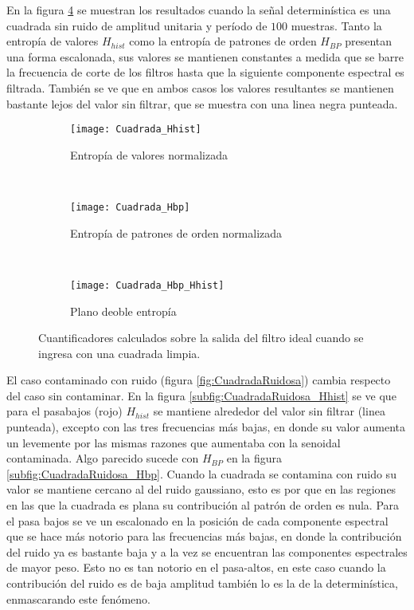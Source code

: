 En la figura \ref{fig:Cuadrada} se muestran los resultados cuando la señal determinística es una cuadrada sin ruido de amplitud unitaria y período de $100$ muestras. Tanto la entropía de valores $H_{hist}$ como la entropía de patrones de orden $H_{BP}$ presentan una forma escalonada, sus valores se mantienen constantes a medida que se barre la frecuencia de corte de los filtros hasta que la siguiente componente espectral es filtrada. También se ve que en ambos casos los valores resultantes se mantienen bastante lejos del valor sin filtrar, que se muestra con una linea negra punteada.

\begin{figure}[h]
    \centering
    \begin{subfigure}[t]{0.32\textwidth}
        \texttt{[image: Cuadrada\_Hhist]}
        \caption{Entropía de valores normalizada}
        \label{subfig:Cuadrada_Hhist}
    \end{subfigure}
    ~ %
    \begin{subfigure}[t]{0.32\textwidth}
        \texttt{[image: Cuadrada\_Hbp]}
        \caption{Entropía de patrones de orden normalizada}
        \label{subfig:Cuadrada_Hbp}
    \end{subfigure}
    ~ %
    \begin{subfigure}[t]{0.32\textwidth}
        \texttt{[image: Cuadrada\_Hbp\_Hhist]}
        \caption{Plano deoble entropía}
        \label{subfig:Cuadrada_HbpHhist}
    \end{subfigure}
    \caption{Cuantificadores calculados sobre la salida del filtro ideal cuando se ingresa con una cuadrada limpia.}\label{fig:Cuadrada}
\end{figure}

El caso contaminado con ruido (figura \ref{fig:CuadradaRuidosa}) cambia respecto del caso sin contaminar. En la figura \ref{subfig:CuadradaRuidosa_Hhist} se ve que para el pasabajos (rojo) $H_{hist}$ se mantiene alrededor del valor sin filtrar (linea punteada), excepto con las tres frecuencias más bajas, en donde su valor aumenta un levemente por las mismas razones que aumentaba con la senoidal contaminada.
Algo parecido sucede con $H_{BP}$ en la figura \ref{subfig:CuadradaRuidosa_Hbp}. Cuando la cuadrada se contamina con ruido su valor se mantiene cercano al del ruido gaussiano, esto es por que en las regiones en las que la cuadrada es plana su contribución al patrón de orden es nula. Para el pasa bajos se ve un escalonado en la posición de cada componente espectral que se hace más notorio para las frecuencias más bajas, en donde la contribución del ruido ya es bastante baja y a la vez se encuentran las componentes espectrales de mayor peso. Esto no es tan notorio en el pasa-altos, en este caso cuando la contribución del ruido es de baja amplitud también lo es la de la determinística, enmascarando este fenómeno.

